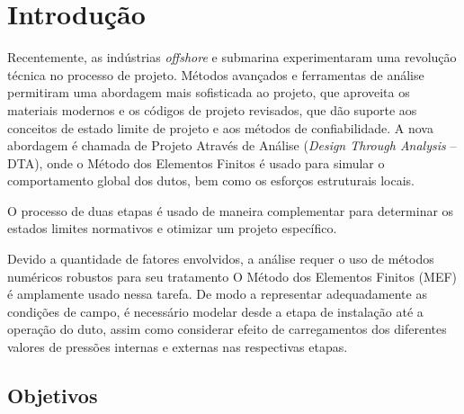 \chapter{Introdução}


Recentemente, as indústrias \textit{offshore} e submarina experimentaram uma revolução técnica no processo de projeto.
Métodos avançados e ferramentas de análise permitiram uma abordagem mais sofisticada ao projeto, que aproveita os materiais modernos e os códigos de projeto revisados, que dão suporte aos conceitos de estado limite de projeto e aos métodos de confiabilidade.
A nova abordagem é chamada de Projeto Através de Análise (\textit{Design Through Analysis} -- DTA), onde o Método dos Elementos Finitos é usado para simular o comportamento global dos dutos, bem como os esforços estruturais locais.

O processo de duas etapas é usado de maneira complementar para determinar os estados limites normativos e otimizar um projeto específico.

Devido a quantidade de fatores envolvidos, a análise requer o uso de métodos numéricos robustos para seu tratamento
O Método dos Elementos Finitos (MEF) é amplamente usado nessa tarefa.
De modo a representar adequadamente as condições de campo, é necessário modelar desde a etapa de instalação até a operação do duto, assim como considerar efeito de carregamentos dos diferentes valores de pressões internas e externas nas respectivas etapas.

\section{Objetivos}
